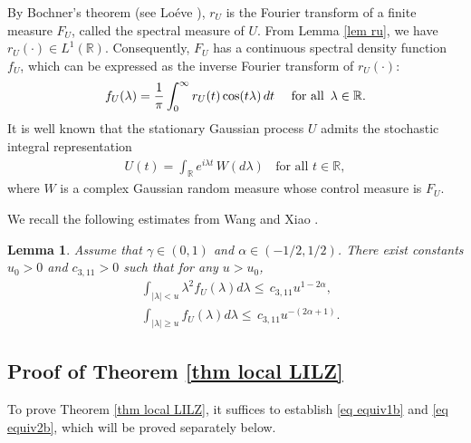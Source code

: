 \documentclass[11pt, reqno]{amsart}
\numberwithin{equation}{section}
\newtheorem{lemma}{Lemma}[section]
\newcommand{\1}{{\bf 1}}
\newcommand{\2}{{\bf 2}}
\begin{document}
By Bochner's theorem (see Lo\'eve \cite[Page 220]{Lo}), $r_U$
is the Fourier transform of a finite measure $F_U$, called the 
spectral measure of $U$. 
From Lemma \ref{lem ru}, we have  $r_U(\cdot)\in L^1(\mathbb R)$. Consequently,    $F_U$ has a continuous spectral
 density function $f_U$, which can be expressed as the inverse Fourier transform of $r_U(\cdot)$:
 $$
 f_U(\lambda)=\frac1\pi\int_0^{\infty}r_U(t)\cos(t\lambda)\,dt  \quad \hbox{ for all } \, \lambda \in \mathbb R.
 $$
  It is well known that the stationary Gaussian process $U $  admits the stochastic integral representation 
   \begin{align}\label{eq U int}
   U(t)=\int_{\mathbb R} e^{i\lambda t}\, W(d\lambda)    \ \ \ \ \text{for all } t\in \mathbb R,
   \end{align}
 where $W$ is a complex Gaussian random measure whose control measure is $F_U$.

 We recall the following estimates from Wang and Xiao \cite[Theorem 4.2]{WX2021a}.

 \begin{lemma}\cite[Theorem 4.2]{WX2021a}\label{lem spectral}
Assume that  $\gamma \in(0,1)$ and $\alpha\in (-1/2, 1/2)$. There exist   constants $u_0>0$ and
$c_{3,11}>0$   such that for any $u >u_0$,
 \begin{align} 
 &\int_{|\lambda|<u}\lambda^2 f_U(\lambda) d\lambda\le  \, c_{3,11} u^{1-2\alpha}, \label{Eq: sp1}\\
 &   \int_{|\lambda|\ge u}  f_U(\lambda) d\lambda\le  \,  c_{3,11} u^{-(2\alpha+1)}. \label{Eq: sp2}
 \end{align}
 \end{lemma}

\subsection{Proof of Theorem \ref{thm local LILZ}}  
To prove Theorem \ref{thm local LILZ}, it suffices to establish \eqref{eq equiv1b} and \eqref{eq equiv2b}, which will be proved separately below.
\end{document}

